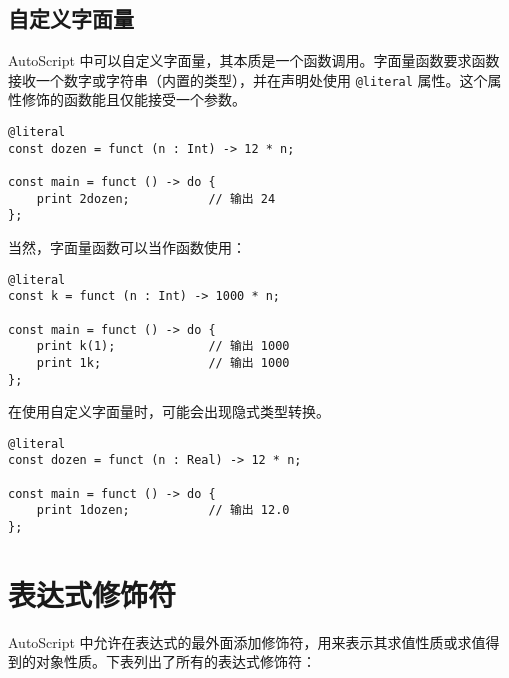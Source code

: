 \subsection{自定义字面量}

AutoScript 中可以自定义字面量，其本质是一个函数调用。字面量函数要求函数接收一个数字或字符串（内置的类型），并在声明处使用 \lstinline!@literal! 属性。这个属性修饰的函数能且仅能接受一个参数。

\begin{lstlisting}
@literal
const dozen = funct (n : Int) -> 12 * n;

const main = funct () -> do {
	print 2dozen;			// 输出 24
};
\end{lstlisting}

当然，字面量函数可以当作函数使用：

\begin{lstlisting}
@literal
const k = funct (n : Int) -> 1000 * n;

const main = funct () -> do {
	print k(1);				// 输出 1000
	print 1k;				// 输出 1000
};
\end{lstlisting}

在使用自定义字面量时，可能会出现隐式类型转换。

\begin{lstlisting}
@literal
const dozen = funct (n : Real) -> 12 * n;

const main = funct () -> do {
	print 1dozen;			// 输出 12.0
};
\end{lstlisting}

\section{表达式修饰符}

AutoScript 中允许在表达式的最外面添加修饰符，用来表示其求值性质或求值得到的对象性质。下表列出了所有的表达式修饰符：

